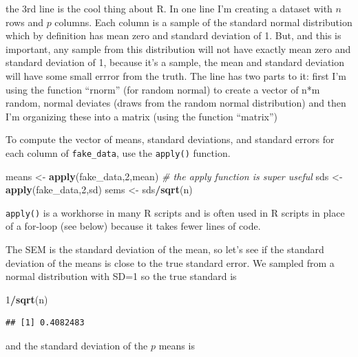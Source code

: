 \documentclass[]{book}
\newenvironment{Shaded}{\begin{snugshade}}{\end{snugshade}}
\newcommand{\KeywordTok}[1]{\textcolor[rgb]{0.13,0.29,0.53}{\textbf{#1}}}
\newcommand{\DecValTok}[1]{\textcolor[rgb]{0.00,0.00,0.81}{#1}}
\newcommand{\StringTok}[1]{\textcolor[rgb]{0.31,0.60,0.02}{#1}}
\newcommand{\CommentTok}[1]{\textcolor[rgb]{0.56,0.35,0.01}{\textit{#1}}}
\newcommand{\OperatorTok}[1]{\textcolor[rgb]{0.81,0.36,0.00}{\textbf{#1}}}
\newcommand{\NormalTok}[1]{#1}
\begin{document}
the 3rd line is the cool thing about R. In one line I'm creating a
dataset with \(n\) rows and \(p\) columns. Each column is a sample of
the standard normal distribution which by definition has mean zero and
standard deviation of 1. But, and this is important, any sample from
this distribution will not have exactly mean zero and standard deviation
of 1, because it's a sample, the mean and standard deviation will have
some small errror from the truth. The line has two parts to it: first
I'm using the function ``rnorm'' (for random normal) to create a vector
of n*m random, normal deviates (draws from the random normal
distribution) and then I'm organizing these into a matrix (using the
function ``matrix'')

To compute the vector of means, standard deviations, and standard errors
for each column of \texttt{fake\_data}, use the \texttt{apply()}
function.

\begin{Shaded}
\begin{Highlighting}[]
\NormalTok{means <-}\StringTok{ }\KeywordTok{apply}\NormalTok{(fake_data,}\DecValTok{2}\NormalTok{,mean) }\CommentTok{# the apply function is super useful}
\NormalTok{sds <-}\StringTok{ }\KeywordTok{apply}\NormalTok{(fake_data,}\DecValTok{2}\NormalTok{,sd)}
\NormalTok{sems <-}\StringTok{ }\NormalTok{sds}\OperatorTok{/}\KeywordTok{sqrt}\NormalTok{(n)}
\end{Highlighting}
\end{Shaded}

\texttt{apply()} is a workhorse in many R scripts and is often used in R
scripts in place of a for-loop (see below) because it takes fewer lines
of code.

The SEM is the standard deviation of the mean, so let's see if the
standard deviation of the means is close to the true standard error. We
sampled from a normal distribution with SD=1 so the true standard is

\begin{Shaded}
\begin{Highlighting}[]
\DecValTok{1}\OperatorTok{/}\KeywordTok{sqrt}\NormalTok{(n)}
\end{Highlighting}
\end{Shaded}

\begin{verbatim}
## [1] 0.4082483
\end{verbatim}

and the standard deviation of the \(p\) means is
\end{document}
